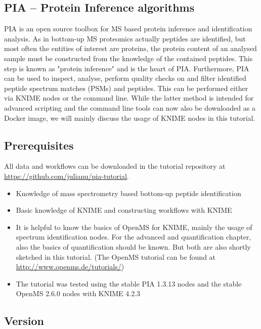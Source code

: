 \documentclass[a4paper,11pt,twoside]{article}
\begin{document}
\subsection{PIA -- Protein Inference algorithms}

PIA is an open source toolbox for MS based protein inference and identification
analysis. As in bottom-up MS proteomics actually peptides are identified, but
most often the entities of interest are proteins, the protein content of an
analysed sample must be constructed from the knowledge of the contained
peptides. This step is known as "protein inference" and is the heart of PIA.
Furthermore, PIA can be used to inspect, analyse, perform quality checks
on and filter identified peptide spectrum matches (PSMs) and peptides. This can
be performed either via KNIME nodes or the command line. While the latter
method is intended for advanced scripting and the command line tools can now
also be downloaded as a Docker image, we will mainly discuss the usage of KNIME
nodes in this tutorial.


\subsection{Prerequisites}

All data and workflows can be downloaded in the tutorial repository at\\
\url{https://github.com/julianu/pia-tutorial}.

\begin{itemize}
	\item Knowledge of mass spectrometry based bottom-up peptide identification
	\item Basic knowledge of KNIME and constructing workflows with KNIME

	\item It is helpful to know the basics of OpenMS for KNIME, mainly the usage
	of spectrum identification nodes. For the advanced and quantification chapter,
	also the basics of quantification should be known. But both are also shortly
	sketched in this tutorial. (The OpenMS tutorial can be found at
	\url{http://www.openms.de/tutorials/})

	\item The tutorial was tested using the stable PIA 1.3.13 nodes and the stable
	OpenMS 2.6.0 nodes with KNIME 4.2.3
\end{itemize}

\subsection{Version}
\end{document}
